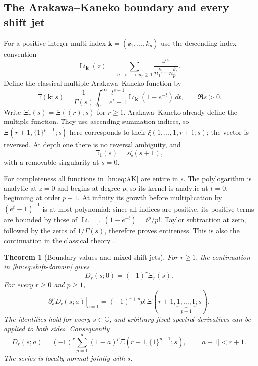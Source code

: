 \documentclass[11pt,a4paper]{article}
\numberwithin{equation}{section}
\newtheorem{theorem}{Theorem}[section]
\theoremstyle{definition}
\theoremstyle{remark}
\begin{document}
\subsection{The Arakawa--Kaneko boundary and every shift jet}

For a positive integer multi-index
$\boldsymbol{k}=(k_1,\ldots,k_p)$ use the descending-index convention
\[
 \operatorname{Li}_{\boldsymbol{k}}(z)
 =\sum_{n_1>\cdots>n_p\ge1}
       \frac{z^{n_1}}{n_1^{k_1}\cdots n_p^{k_p}}.
\]
Define the classical multiple Arakawa--Kaneko function by
\begin{equation}\label{hn:eq:AK}
 \Xi(\boldsymbol{k};s)=\frac1{\Gamma(s)}\int_0^\infty
       \frac{t^{s-1}}{e^t-1}
              \operatorname{Li}_{\boldsymbol{k}}(1-e^{-t})\,dt,
 \qquad \Re s>0.
\end{equation}
Write $\Xi_r(s)=\Xi((r);s)$ for $r\ge1$.
Arakawa--Kaneko \cite{AK1999} already define the multiple function.
They use ascending summation indices, so
$\Xi(r+1,\{1\}^{p-1};s)$ here corresponds to their
$\xi(1,\ldots,1,r+1;s)$; the vector is reversed.
At depth one there is no reversal ambiguity, and
\[
                         \Xi_1(s)=s\zeta(s+1),
\]
with a removable singularity at $s=0$.

For completeness all functions in \eqref{hn:eq:AK} are entire in $s$.
The polylogarithm is analytic at $z=0$ and begins at degree $p$,
so its kernel is analytic at $t=0$, beginning at order $p-1$.
At infinity its growth before multiplication by $(e^t-1)^{-1}$
is at most polynomial: since all indices are positive, its
positive terms are bounded by those of
$\operatorname{Li}_{1,\ldots,1}(1-e^{-t})=t^p/p!$.
Taylor subtraction at zero, followed by the zeros of $1/\Gamma(s)$,
therefore proves entireness. This is also the continuation in
the classical theory \cite{AK1999,KT2018}.

\begin{theorem}[Boundary values and mixed shift jets]\label{hn:thm:AKbridge}
For $r\ge1$, the continuation in \eqref{hn:eq:shift-domain} gives
\begin{equation}\label{hn:eq:a0}
                      D_r(s;0)=(-1)^r\Xi_r(s).
\end{equation}
For every $r\ge0$ and $p\ge1$,
\begin{equation}\label{hn:eq:a1-jets}
 \boxed{\displaystyle
 \left.\partial_a^pD_r(s;a)\right|_{a=1}
  =(-1)^{r+p}p!\,
          \Xi(r+1,\underbrace{1,\ldots,1}_{p-1};s).}
\end{equation}
The identities hold for every $s\in\mathbb C$, and arbitrary
fixed spectral derivatives can be applied to both sides.
Consequently
\begin{equation}\label{hn:eq:AK-Taylor}
 D_r(s;a)=(-1)^r\sum_{p=1}^\infty
       (1-a)^p\Xi(r+1,\{1\}^{p-1};s),
 \qquad |a-1|<r+1.
\end{equation}
The series is locally normal jointly with $s$.
\end{theorem}
\end{document}
